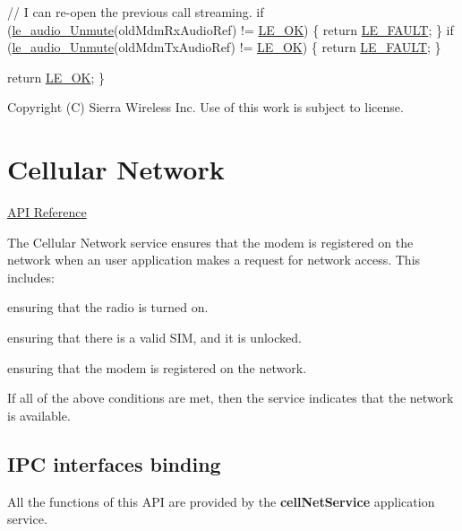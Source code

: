 \begin{DoxyCode}
    \textcolor{comment}{// I can re-open the previous call streaming.}
    \textcolor{keywordflow}{if} (\hyperlink{le__audio__interface_8h_adad24547293481964039efe56bc14e2b}{le\_audio\_Unmute}(oldMdmRxAudioRef) != \hyperlink{le__basics_8h_a1cca095ed6ebab24b57a636382a6c86ca5066a4bcec691c6b67843b8f79656422}{LE\_OK})
    \{
        \textcolor{keywordflow}{return} \hyperlink{le__basics_8h_a1cca095ed6ebab24b57a636382a6c86cac409634423b6b1ef09643529f6224798}{LE\_FAULT};
    \}
    \textcolor{keywordflow}{if} (\hyperlink{le__audio__interface_8h_adad24547293481964039efe56bc14e2b}{le\_audio\_Unmute}(oldMdmTxAudioRef) != \hyperlink{le__basics_8h_a1cca095ed6ebab24b57a636382a6c86ca5066a4bcec691c6b67843b8f79656422}{LE\_OK})
    \{
        \textcolor{keywordflow}{return} \hyperlink{le__basics_8h_a1cca095ed6ebab24b57a636382a6c86cac409634423b6b1ef09643529f6224798}{LE\_FAULT};
    \}

    \textcolor{keywordflow}{return} \hyperlink{le__basics_8h_a1cca095ed6ebab24b57a636382a6c86ca5066a4bcec691c6b67843b8f79656422}{LE\_OK};
\}
\end{DoxyCode}






Copyright (C) Sierra Wireless Inc. Use of this work is subject to license. \hypertarget{c_le_cellnet}{}\section{Cellular Network}\label{c_le_cellnet}
\hyperlink{le__cellnet__interface_8h}{A\+P\+I Reference}





The Cellular Network service ensures that the modem is registered on the network when an user application makes a request for network access. This includes\+:
\begin{DoxyItemize}
\item ensuring that the radio is turned on.
\item ensuring that there is a valid S\+I\+M, and it is unlocked.
\item ensuring that the modem is registered on the network.
\end{DoxyItemize}

If all of the above conditions are met, then the service indicates that the network is available.\hypertarget{c_le_cellnet_le_cellnet_binding}{}\subsection{I\+P\+C interfaces binding}\label{c_le_cellnet_le_cellnet_binding}
All the functions of this A\+P\+I are provided by the {\bfseries cell\+Net\+Service} application service.

